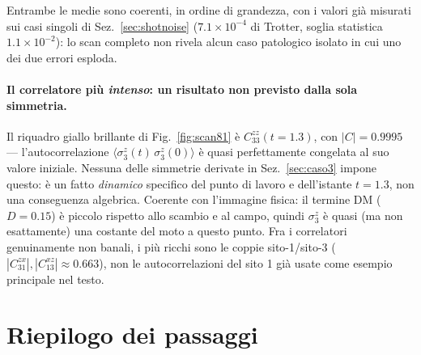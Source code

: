 \documentclass[11pt,a4paper]{article}
\begin{document}
\noindent
Entrambe le medie sono coerenti, in ordine di grandezza, con i valori già misurati sui casi singoli
di Sez.~\ref{sec:shotnoise} ($7.1\times10^{-4}$ di Trotter, soglia statistica $1.1\times10^{-2}$):
lo scan completo non rivela alcun caso patologico isolato in cui uno dei due errori esploda.

\paragraph{Il correlatore più \emph{intenso}: un risultato non previsto dalla sola simmetria.} Il
riquadro giallo brillante di Fig.~\ref{fig:scan81} è $C_{33}^{zz}(t{=}1.3)$, con $|C|=0.9995$ ---
l'autocorrelazione $\langle\sigma_3^z(t)\,\sigma_3^z(0)\rangle$ è quasi perfettamente congelata al
suo valore iniziale. Nessuna delle simmetrie derivate in Sez.~\ref{sec:caso3} impone questo: è un
fatto \emph{dinamico} specifico del punto di lavoro e dell'istante $t=1.3$, non una conseguenza
algebrica. Coerente con l'immagine fisica: il termine DM ($D=0.15$) è piccolo rispetto allo scambio
e al campo, quindi $\sigma_3^z$ è quasi (ma non esattamente) una costante del moto a questo punto.
Fra i correlatori genuinamente non banali, i più ricchi sono le coppie sito-1/sito-3
($|C_{31}^{zx}|,|C_{13}^{xz}|\approx0.663$), non le autocorrelazioni del sito 1 già usate come
esempio principale nel testo.

\section{Riepilogo dei passaggi}
\end{document}
